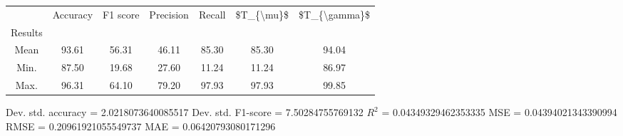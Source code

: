 \begin{tabular}{|c|c|c|c|c|c|c|}
\toprule
{} &  Accuracy &  F1 score &  Precision &  Recall &  \$T\_\{\textbackslash mu\}\$ &  \$T\_\{\textbackslash gamma\}\$ \\
Results &           &           &            &         &            &               \\
\hline
Mean    &     93.61 &     56.31 &      46.11 &   85.30 &      85.30 &         94.04 \\
Min.    &     87.50 &     19.68 &      27.60 &   11.24 &      11.24 &         86.97 \\
Max.    &     96.31 &     64.10 &      79.20 &   97.93 &      97.93 &         99.85 \\
\bottomrule
\end{tabular}

 Dev. std. accuracy = 2.0218073640085517
 Dev. std. F1-score = 7.50284755769132
 $R^2$ = 0.04349329462353335
 MSE = 0.04394021343390994
 RMSE = 0.20961921055549737
 MAE = 0.06420793080171296